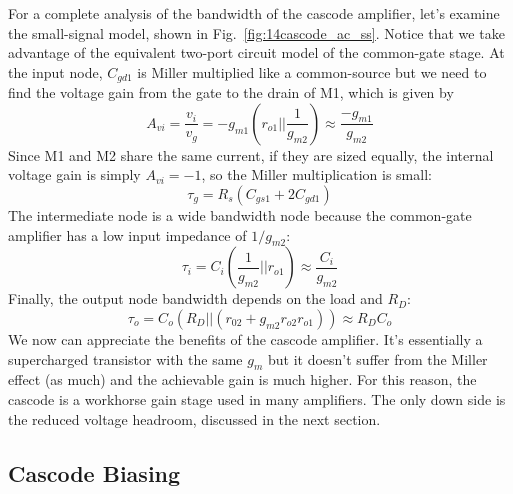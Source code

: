 For a complete analysis of the bandwidth of the cascode amplifier, let's examine the small-signal model, shown in Fig.~\ref{fig:14cascode_ac_ss}.  Notice that we take advantage of the equivalent two-port circuit model of the common-gate stage.   At the input node, $C_{gd1}$ is Miller multiplied like a common-source but we need to find the voltage gain from the gate to the drain of M1, which is given by
%
 \begin{equation}
	A_{vi} = \frac{v_i}{v_g} = -g_{m1} \left( r_{o1} || \frac{1}{g_{m2}} \right) 
	\approx \frac{-g_{m1}}{g_{m2}}
\end{equation}
%
Since M1 and M2 share the same current, if they are sized equally, the internal voltage gain is simply $A_{vi} = -1$, so the Miller multiplication is small:
%
 \begin{equation}
	\tau_g = R_{s} (C_{gs1} + 2 C_{gd1})
\end{equation}
%
The intermediate node is a wide bandwidth node because the common-gate amplifier has a low input impedance of $1/g_{m2}$:
%
 \begin{equation}
	\tau_i = C_i \left(\frac{1}{g_{m2}} || r_{o1}  \right) \approx \frac{C_i}{g_{m2}}
\end{equation}  
%
Finally, the output node bandwidth depends on the load and $R_D$:
%
 \begin{equation}
	\tau_o = C_o (R_D || (r_{02} + g_{m2}r_{o2} r_{o1})) \approx R_D C_o
\end{equation}
%
We now can appreciate the benefits of the cascode amplifier.  It's essentially a supercharged transistor with the same $g_m$ but it doesn't suffer from the Miller effect (as much) and the achievable gain is much higher.  For this reason, the cascode is a workhorse gain stage used in many amplifiers.  The only down side is the reduced voltage headroom, discussed in the next section.



\subsection{Cascode Biasing}


